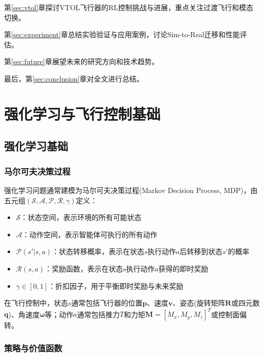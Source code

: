 \documentclass[12pt,a4paper]{ctexart}
\begin{document}
第\ref{sec:vtol}章探讨VTOL飞行器的RL控制挑战与进展，重点关注过渡飞行和模态切换。

第\ref{sec:experiment}章总结实验验证与应用案例，讨论Sim-to-Real迁移和性能评估。

第\ref{sec:future}章展望未来的研究方向和技术趋势。

最后，第\ref{sec:conclusion}章对全文进行总结。

\section{强化学习与飞行控制基础}\label{sec:background}

\subsection{强化学习基础}

\subsubsection{马尔可夫决策过程}

强化学习问题通常建模为马尔可夫决策过程(Markov Decision Process, MDP)，由五元组$(\mathcal{S}, \mathcal{A}, \mathcal{P}, \mathcal{R}, \gamma)$定义：

\begin{itemize}
    \item $\mathcal{S}$：状态空间，表示环境的所有可能状态
    \item $\mathcal{A}$：动作空间，表示智能体可执行的所有动作
    \item $\mathcal{P}(s'|s,a)$：状态转移概率，表示在状态$s$执行动作$a$后转移到状态$s'$的概率
    \item $\mathcal{R}(s,a)$：奖励函数，表示在状态$s$执行动作$a$获得的即时奖励
    \item $\gamma \in [0,1]$：折扣因子，用于平衡即时奖励与未来奖励
\end{itemize}

在飞行控制中，状态$s$通常包括飞行器的位置$\mathbf{p}$、速度$\mathbf{v}$、姿态(旋转矩阵$\mathbf{R}$或四元数$\mathbf{q}$)、角速度$\boldsymbol{\omega}$等；动作$a$通常包括推力$T$和力矩$\mathbf{M} = [M_x, M_y, M_z]^T$或控制面偏转。

\subsubsection{策略与价值函数}
\end{document}
